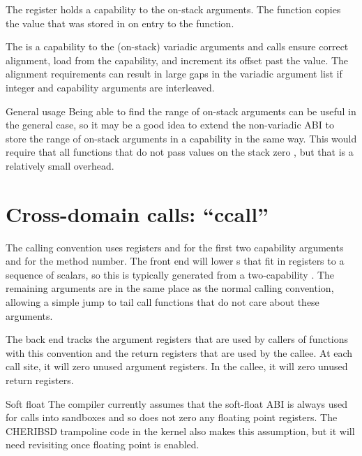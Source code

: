 The  register holds a capability to the on-stack arguments.
The  function copies the value that was stored in  on entry to the function.

The  is a capability to the (on-stack) variadic arguments and  calls ensure correct alignment, load from the capability, and increment its offset past the value.
The alignment requirements can result in large gaps in the variadic argument list if integer and capability arguments are interleaved.

\begin{notebox}{General usage}
	Being able to find the range of on-stack arguments can be useful in the general case, so it may be a good idea to extend the non-variadic ABI to store the range of on-stack arguments in a capability in the same way.
	This would require that all functions that do not pass values on the stack zero , but that is a relatively small overhead.
\end{notebox}

\section{Cross-domain calls: ``ccall''}

The  calling convention uses registers  and  for the first two capability arguments and  for the method number.
The front end will lower s that fit in registers to a sequence of scalars, so this is typically generated from a two-capability .
The remaining arguments are in the same place as the normal calling convention, allowing a simple jump to tail call functions that do not care about these arguments.

The back end tracks the argument registers that are used by callers of functions with this convention and the return registers that are used by the callee.
At each call site, it will zero unused argument registers.
In the callee, it will zero unused return registers.

\begin{notebox}{Soft float}
	The compiler currently assumes that the soft-float ABI is always used for calls into sandboxes and so does not zero any floating point registers.
	The CHERIBSD trampoline code in the kernel also makes this assumption, but it will need revisiting once floating point is enabled.
\end{notebox}


